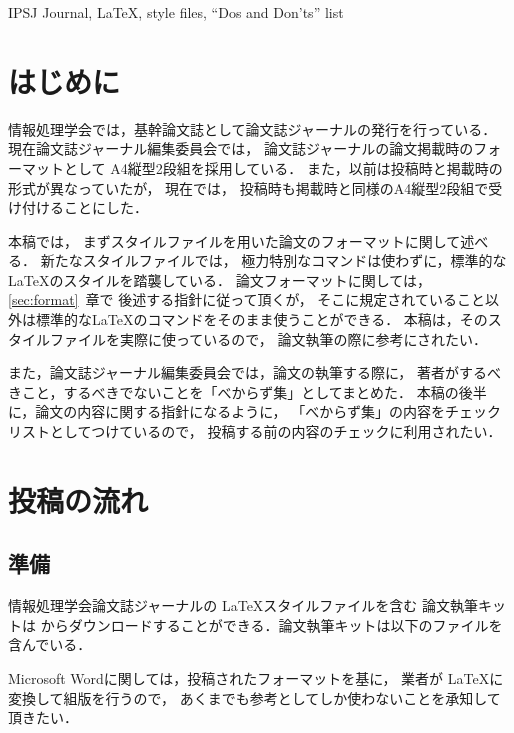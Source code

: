 \documentclass[submit]{ipsj}
\begin{document}
\begin{ekeyword}
IPSJ Journal, \LaTeX, style files, ``Dos and Don'ts'' list
\end{ekeyword}

\maketitle

\section{はじめに}
情報処理学会では，基幹論文誌として論文誌ジャーナルの発行を行っている．
現在論文誌ジャーナル編集委員会では，
論文誌ジャーナルの論文掲載時のフォーマットとして
A4縦型2段組を採用している．
また，以前は投稿時と掲載時の形式が異なっていたが，
現在では，
投稿時も掲載時と同様のA4縦型2段組で受け付けることにした．



本稿では，
まずスタイルファイルを用いた論文のフォーマットに関して述べる．
新たなスタイルファイルでは，
極力特別なコマンドは使わずに，標準的な \LaTeX のスタイルを踏襲している．
論文フォーマットに関しては，\ref{sec:format}~章で
後述する指針に従って頂くが，
そこに規定されていること以外は標準的な\LaTeX のコマンドをそのまま使うことができる．
本稿は，そのスタイルファイルを実際に使っているので，
論文執筆の際に参考にされたい．

また，論文誌ジャーナル編集委員会では，論文の執筆する際に，
著者がするべきこと，するべきでないことを「べからず集」としてまとめた．
本稿の後半に，論文の内容に関する指針になるように，
「べからず集」の内容をチェックリストとしてつけているので，
投稿する前の内容のチェックに利用されたい．




\section{投稿の流れ}


\subsection{準備}


情報処理学会論文誌ジャーナルの \LaTeX スタイルファイルを含む
論文執筆キットは
からダウンロードすることができる．論文執筆キットは以下のファイルを含んでいる．


Microsoft Wordに関しては，投稿されたフォーマットを基に，
業者が \LaTeX に変換して組版を行うので，
あくまでも参考としてしか使わないことを承知して頂きたい．
\end{document}
